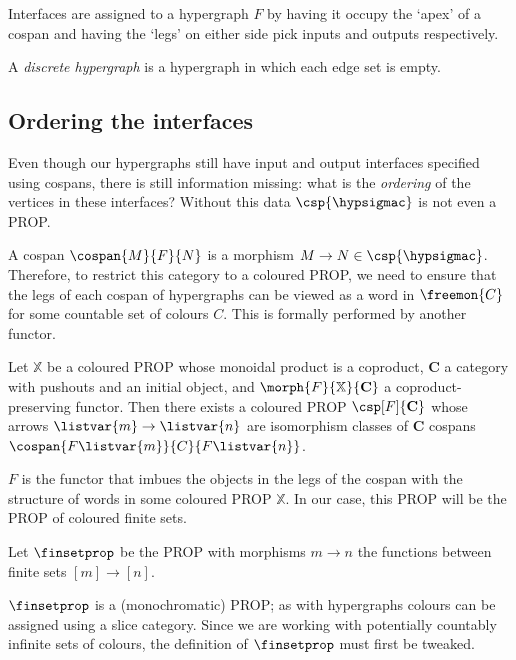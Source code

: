 Interfaces are assigned to a hypergraph \(F\) by having it occupy the `apex' of
a cospan and having the `legs' on either side pick inputs and outputs
respectively.

\begin{definition}
    A \emph{discrete hypergraph} is a hypergraph in which each edge set is
    empty.
\end{definition}

\subsection{Ordering the interfaces}

Even though our hypergraphs still have input and output interfaces specified
using cospans, there is still information missing: what is the \emph{ordering}
of the vertices in these interfaces?
Without this data \(\csp{\hypsigmac}\) is not even a PROP.

A cospan \(\cospan{M}{F}{N}\) is a morphism
\(M \to N \in \csp{\hypsigmac}\).
Therefore, to restrict this category to a coloured PROP, we need to ensure that
the legs of each cospan of hypergraphs can be viewed as a word in
\(\freemon{C}\) for some countable set of colours \(C\).
This is formally performed by another functor.

\begin{theorem}
    Let \(\mathbb{X}\) be a coloured PROP whose monoidal product is a coproduct,
    \(\mathbf{C}\) a category with pushouts and an initial object, and \(
        \morph{F}{\mathbb{X}}{\mathbf{C}}
    \) a coproduct-preserving functor.
    Then there exists a coloured PROP \(\csp[F]{\mathbf{C}}\) whose arrows
    \(\listvar{m} \to \listvar{n}\) are isomorphism classes of \(\mathbf{C}\)
    cospans \(\cospan{F\listvar{m}}{C}{F\listvar{n}}\).
\end{theorem}

\(F\) is the functor that imbues the objects in the legs of the cospan with the
structure of words in some coloured PROP \(\mathbb{X}\).
In our case, this PROP will be the PROP of coloured finite sets.

\begin{definition}
    Let \(\finsetprop\) be the PROP with morphisms \(m \to n\) the functions
    between finite sets \([m] \to [n]\).
\end{definition}

\(\finsetprop\) is a (monochromatic) PROP; as with hypergraphs colours can be
assigned using a slice category.
Since we are working with potentially countably infinite sets of colours, the
definition of \(\finsetprop\) must first be tweaked.

